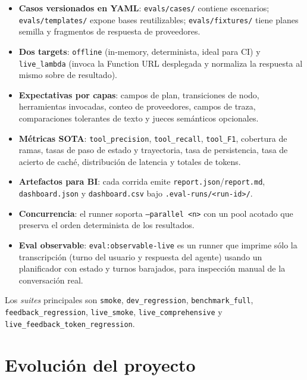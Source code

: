 \documentclass[11pt,a4paper]{article}
\begin{document}
\begin{itemize}[leftmargin=*,itemsep=1pt]
  \item \textbf{Casos versionados en YAML}: \texttt{evals/cases/}
        contiene escenarios; \texttt{evals/templates/} expone bases
        reutilizables; \texttt{evals/fixtures/} tiene planes semilla
        y fragmentos de respuesta de proveedores.
  \item \textbf{Dos targets}: \texttt{offline} (in-memory,
        determinista, ideal para CI) y \texttt{live\_lambda} (invoca
        la Function URL desplegada y normaliza la respuesta al mismo
        sobre de resultado).
  \item \textbf{Expectativas por capas}: campos de plan, transiciones
        de nodo, herramientas invocadas, conteo de proveedores, campos
        de traza, comparaciones tolerantes de texto y jueces
        semánticos opcionales.
  \item \textbf{Métricas SOTA}: \texttt{tool\_precision},
        \texttt{tool\_recall}, \texttt{tool\_F1}, cobertura de ramas,
        tasas de paso de estado y trayectoria, tasa de persistencia,
        tasa de acierto de caché, distribución de latencia y totales
        de tokens.
  \item \textbf{Artefactos para BI}: cada corrida emite
        \texttt{report.json}/\texttt{report.md},
        \texttt{dashboard.json} y \texttt{dashboard.csv} bajo
        \texttt{.eval-runs/<run-id>/}.
  \item \textbf{Concurrencia}: el runner soporta
        \texttt{--parallel <n>} con un pool acotado que preserva el
        orden determinista de los resultados.
  \item \textbf{Eval observable}: \texttt{eval:observable-live} es un
        runner que imprime sólo la transcripción (turno del usuario y
        respuesta del agente) usando un planificador con estado y
        turnos barajados, para inspección manual de la conversación
        real.
\end{itemize}

Los \emph{suites} principales son \texttt{smoke}, \texttt{dev\_regression},
\texttt{benchmark\_full}, \texttt{feedback\_regression},
\texttt{live\_smoke}, \texttt{live\_comprehensive} y
\texttt{live\_feedback\_token\_regression}.

\section{Evolución del proyecto}
\end{document}
